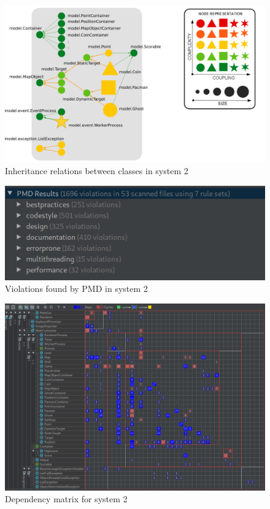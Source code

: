 \documentclass[]{article}
\begin{document}
\begin{figure}[h]
\centering
\includegraphics[width=0.8\linewidth]{S2-named_inheritance}
\caption{Inheritance relations between classes in system 2}
\label{fig:S2_inheritance}
\end{figure}

\vspace{0.4cm}

\begin{figure}[h]
\centering
\includegraphics[width=0.7\linewidth]{S2-PMD_results}
\caption{Violations found by PMD in system 2}
\label{fig:S2_PMD}
\end{figure}

\newpage

\begin{figure}[h]
\centering
\includegraphics[width=0.9\linewidth]{S2-dep_matrix}
\caption{Dependency matrix for system 2}
\label{fig:S2_dep_matrix}
\end{figure}
\end{document}
